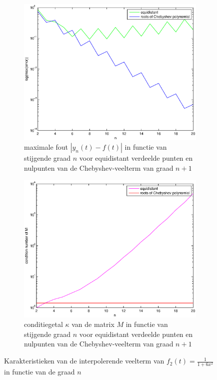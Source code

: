 \documentclass[a4paper]{article}
\begin{document}
\begin{figure}
    \centering
    \begin{subfigure}[b]{0.45\textwidth}
        \centering
        \includegraphics[width=\textwidth]{Jona/error_global_f2.eps}
        \caption{maximale fout $|y_{n}(t)-f(t)|$ in functie van stijgende graad $n$ voor equidistant verdeelde punten en nulpunten van de Chebyshev-veelterm van graad $n+1$}
        \label{fig:error_global_f2}
    \end{subfigure}
    \begin{subfigure}[b]{0.45\textwidth}
        \centering
        \includegraphics[width=\textwidth]{Jona/condition_f2.eps}
        \caption{conditiegetal $\kappa$ van de matrix $M$ in functie van stijgende graad $n$ voor equidistant verdeelde punten en nulpunten van de Chebyshev-veelterm van graad $n+1$}
        \label{fig:condition_f2}
    \end{subfigure}
    \hfill
    \caption{Karakteristieken van de interpolerende veelterm van $f_{2}(t) = \frac{1}{1+6x^{2}}$ in functie van de graad $n$}
    \label{characteristics_f2}
    \end{figure}    
\end{document}
